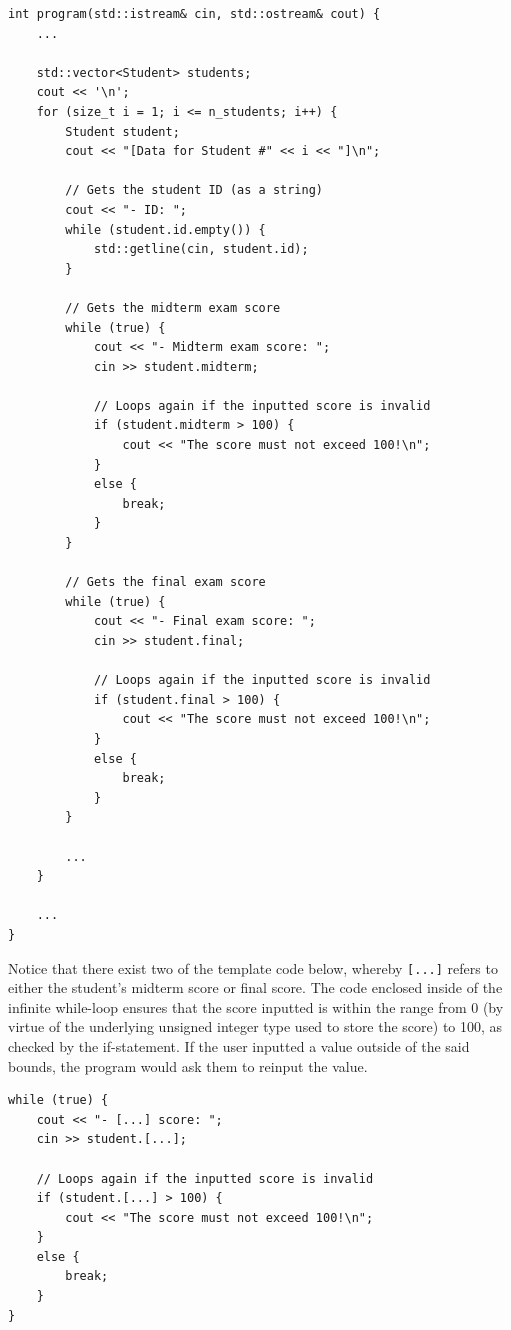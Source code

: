 \documentclass[12pt]{article}
\begin{document}
\begin{verbatim}
int program(std::istream& cin, std::ostream& cout) {
    ...

    std::vector<Student> students;
    cout << '\n';
    for (size_t i = 1; i <= n_students; i++) {
        Student student;
        cout << "[Data for Student #" << i << "]\n";

        // Gets the student ID (as a string)
        cout << "- ID: ";
        while (student.id.empty()) {
            std::getline(cin, student.id);
        }

        // Gets the midterm exam score
        while (true) {
            cout << "- Midterm exam score: ";
            cin >> student.midterm;

            // Loops again if the inputted score is invalid
            if (student.midterm > 100) {
                cout << "The score must not exceed 100!\n";
            }
            else {
                break;
            }
        }

        // Gets the final exam score
        while (true) {
            cout << "- Final exam score: ";
            cin >> student.final;

            // Loops again if the inputted score is invalid
            if (student.final > 100) {
                cout << "The score must not exceed 100!\n";
            }
            else {
                break;
            }
        }

        ...
    }

    ...
}
\end{verbatim}

Notice that there exist two of the template code below, whereby \texttt{[...]} refers to either the student's midterm score or final score. The code enclosed inside of the infinite while-loop ensures that the score inputted is within the range from 0 (by virtue of the underlying unsigned integer type used to store the score) to 100, as checked by the if-statement. If the user inputted a value outside of the said bounds, the program would ask them to reinput the value.

\begin{verbatim}
while (true) {
    cout << "- [...] score: ";
    cin >> student.[...];

    // Loops again if the inputted score is invalid
    if (student.[...] > 100) {
        cout << "The score must not exceed 100!\n";
    }
    else {
        break;
    }
}
\end{verbatim}
\end{document}
